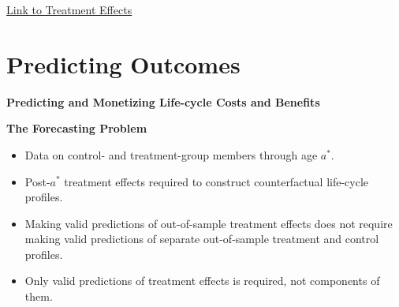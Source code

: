 \documentclass[static]{JJH-Beamer}
\begin{document}
\begin{frame}

\hypertarget{ret:gum}{}
\begin{center}
\hyperlink{gum}{\underline{Link to Treatment Effects}}
\end{center}

\end{frame}

\section{Predicting Outcomes}

\begin{frame}

\begin{block}{}
\begin{center}
\textbf{Predicting and Monetizing Life-cycle Costs and Benefits}
\end{center}
\end{block}

\end{frame}

\begin{frame}

\begin{center}
\textbf{The Forecasting Problem}
\end{center}

\end{frame}

\begin{frame}

\begin{itemize}
\item Data on control- and treatment-group members through age $a^{\ast}$.
\item Post-$a^{\ast}$ treatment effects required to construct counterfactual life-cycle profiles.
\item Making valid predictions of out-of-sample treatment effects does not require making valid predictions of separate out-of-sample treatment and control profiles.
\item Only valid predictions of treatment effects is required, not components of them.
\end{itemize}

\end{frame}
\end{document}
